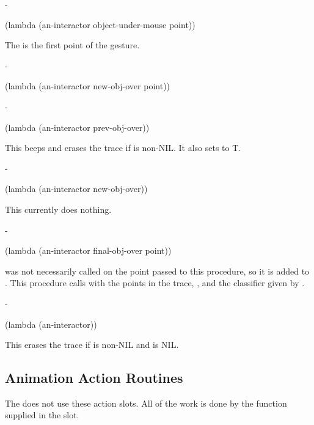 \begin{description}

 -
\begin{programinlist}
(lambda (an-interactor object-under-mouse point))
\end{programinlist}
The  is the first point of the gesture.




 -
\begin{programinlist}
(lambda (an-interactor new-obj-over point))
\end{programinlist}



 -
\begin{programinlist}
(lambda (an-interactor prev-obj-over))
\end{programinlist}
This beeps and erases the trace if  is non-NIL. It also
sets  to T.



 -
\begin{programinlist}
(lambda (an-interactor new-obj-over))
\end{programinlist}
This currently does nothing.



 -
\begin{programinlist}
(lambda (an-interactor final-obj-over point))
\end{programinlist}
 was not necessarily called on the point passed to this
procedure, so it is added to .  This procedure calls
 with the points in the trace, , and
the classifier given by .




 -
\begin{programinlist}
(lambda (an-interactor))
\end{programinlist}
This erases the trace if  is non-NIL and
 is NIL.


\end{description}


\subsection{Animation Action Routines}

The  does not use these action slots.  All of the
work is done by the function supplied in the  slot.




